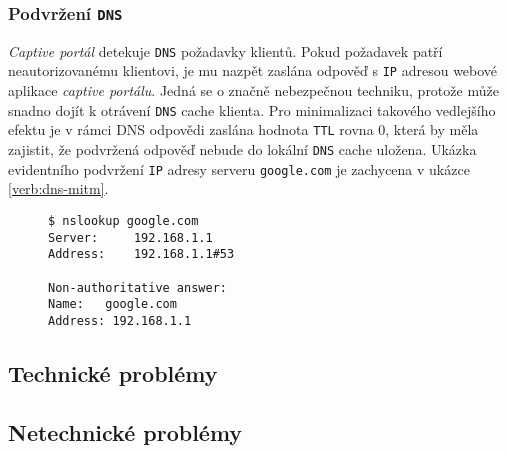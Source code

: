\documentclass[thesis=M,czech]{FITthesis}[2012/10/20]
\renewcommand{\lstlistingname}{Ukázka kódu}
\begin{document}
\subsubsection{Podvržení \texttt{DNS}}

\textit{Captive portál} detekuje \texttt{DNS} požadavky klientů. Pokud požadavek patří neautorizovanému klientovi, je mu nazpět zaslána odpověď s \texttt{IP} adresou webové aplikace \textit{captive portálu}. Jedná se o značně nebezpečnou techniku, protože může snadno dojít k otrávení \texttt{DNS} cache klienta. Pro minimalizaci takového vedlejšího efektu je v rámci DNS odpovědi zaslána hodnota \texttt{TTL} rovna 0, která by měla zajistit, že podvržená odpověď nebude do lokální \texttt{DNS} cache uložena. Ukázka evidentního podvržení \texttt{IP} adresy serveru \texttt{google.com} je zachycena v ukázce \ref{verb:dns-mitm}.

\begin{figure}[h]
  \renewcommand{\lstlistingname}{Ukázka}
  \begin{lstlisting}[label=verb:dns-mitm, caption={Ukázka podvržení DNS odpovědi},frame=single]
$ nslookup google.com
Server:		192.168.1.1
Address:	192.168.1.1#53

Non-authoritative answer:
Name:	google.com
Address: 192.168.1.1
  \end{lstlisting}
\end{figure}


\subsection{Technické problémy}




\subsection{Netechnické problémy}
\end{document}
